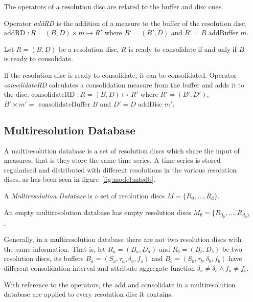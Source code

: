 The operators of a resolution disc are related to
the buffer and disc ones.

Operator \emph{addRD} is the addition of a measure to the
buffer of the resolution disc, $\text{addRD } : R=(B,D) \times m \mapsto R'$ where
$R'= (B',D)$ and $B'= B \text{ addBuffer } m$.

Let $R=(B,D)$ be a resolution disc, $R$ is ready to consolidate if and
only if $B$ is ready to consolidate.

If the resolution disc is ready to consolidate, it can be
consolidated.  Operator \emph{consolidateRD} calculates a
consolidation measure from the buffer and adds it to the disc,
$\text{consolidateRD } : R=(B,D) \mapsto R'$ where $R'=
(B',D')$, $B' \times m'= \text{ consolidateBuffer } B $ and $ D'= D
\text{ addDisc } m'$.




\subsection{Multiresolution Database}\label{sec:model:rrd}

A multiresolution database is a set of resolution discs which
share the input of measures, that is they store the same time
series. A time series is stored regularised and distributed with
different resolutions in the various resolution discs, as has been seen
in figure~\ref{fig:model:mtsdb}.

\begin{definition}
  A \emph{Multiresolution Database} is a set of resolution discs
  $M=\{R_0,\dotsc,R_d\}$.
\end{definition}

An empty multiresolution database has empty resolution discs $M_{\emptyset}=\{R_{0_{\emptyset}},\dotsc,R_{d_{\emptyset}\}}$. 
 
Generally, in a multiresolution database there are not two resolution discs
with the same information. That is, let $R_a = (B_a, D_a)$ and $R_b =
(B_b, D_b)$ be two resolution discs, its buffers
$B_a=(S_a,\tau_a,\delta_a,f_a)$ and $B_b=(S_b,\tau_b,\delta_b,f_b)$
have different consolidation interval and attribute aggregate function
$\delta_a \neq \delta_b \wedge f_a \neq f_b$.


With reference to the operators, the add and consolidate in a
multiresolution database are applied to every resolution disc it
contains.


